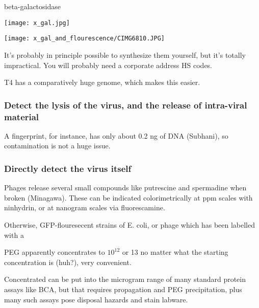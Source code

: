 \documentclass[paper.tex]{subfiles}
\begin{document}
beta-galactosidase



\texttt{[image: x\_gal.jpg]}

\texttt{[image: x\_gal\_and\_flourescence/CIMG6810.JPG]}

 It’s probably in principle possible to synthesize them yourself, but it’s totally impractical. You will probably need a corporate address HS codes. 

T4 has a comparatively huge genome, which makes this easier.


\subsubsection{Detect the lysis of the virus, and the release of intra-viral material}

A fingerprint, for instance, has only about 0.2 ng of DNA (Subhani), so contamination is not a huge issue.

\subsubsection{Directly detect the virus itself}

Phages release several small compounds like putrescine and spermadine when broken (Minagawa\cite{characteristics1961}). These can be indicated colorimetrically at ppm scales with ninhydrin, or at nanogram scales via fluorescamine. 

Otherwise, GFP-flouresecent strains of E. coli, or phage which has been labelled with a 




PEG apparently concentrates to $10^{12}$ or 13 no matter what the starting concentration is (huh?), very convenient.

Concentrated can be put into the microgram range of many standard protein assays like BCA, but that requires propagation and PEG precipitation, plus many such assays pose disposal hazards and stain labware. 
\end{document}
